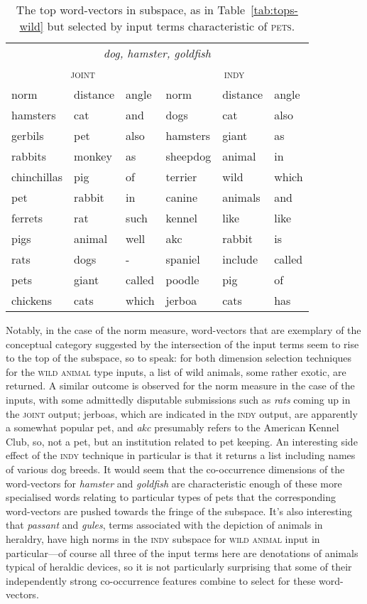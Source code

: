 \begin{table}
\centering
\begin{tabular}{lll|lll}
\hline
\multicolumn{6}{c}{\emph{dog, hamster, goldfish}} \\
\multicolumn{3}{c}{\textsc{joint}} & \multicolumn{3}{c}{\textsc{indy}} \\
\hline
norm & distance & angle & norm & distance & angle \\
\hline
hamsters & cat & and & dogs & cat & also \\
gerbils & pet & also & hamsters & giant & as \\
rabbits & monkey & as & sheepdog & animal & in \\
chinchillas & pig & of & terrier & wild & which \\
pet & rabbit & in & canine & animals & and \\
ferrets & rat & such & kennel & like & like \\
pigs & animal & well & akc & rabbit & is \\
rats & dogs & - & spaniel & include & called \\
pets & giant & called & poodle & pig & of \\
chickens & cats & which & jerboa & cats & has \\
\hline
\end{tabular}
\caption[Top Pet Word-Vectors]{The top word-vectors in subspace, as in Table~\ref{tab:tops-wild} but selected by input terms characteristic of \textsc{pets}.}
\label{tab:tops-pet}
\end{table}

Notably, in the case of the norm measure, word-vectors that are exemplary of the conceptual category suggested by the intersection of the input terms seem to rise to the top of the subspace, so to speak: for both dimension selection techniques for the \textsc{wild animal} type inputs, a list of wild animals, some rather exotic, are returned.  A similar outcome is observed for the norm measure in the case of the  inputs, with some admittedly disputable submissions such as \emph{rats} coming up in the \textsc{joint} output; jerboas, which are indicated in the \textsc{indy} output, are apparently a somewhat popular pet, and \emph{akc} presumably refers to the American Kennel Club, so, not a pet, but an institution related to pet keeping.  An interesting side effect of the \textsc{indy} technique in particular is that it returns a list including names of various dog breeds.  It would seem that the co-occurrence dimensions of the word-vectors for \emph{hamster} and \emph{goldfish} are characteristic enough of these more specialised words relating to particular types of pets that the corresponding word-vectors are pushed towards the fringe of the subspace.  It's also interesting that \emph{passant} and \emph{gules}, terms associated with the depiction of animals in heraldry, have high norms in the \textsc{indy} subspace for \textsc{wild animal} input in particular---of course all three of the input terms here are denotations of animals typical of heraldic devices, so it is not particularly surprising that some of their independently strong co-occurrence features combine to select for these word-vectors.

